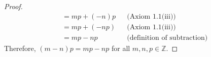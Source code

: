 \begin{enumerate}[label=(\roman*)]
\begin{proof}
\begin{align*}
                         & = mp+(-n)p  &  & \text{(Axiom 1.1(iii))}            \\
                         & = mp+(-np)  &  & \text{(Axiom 1.1(iii))}            \\
                         & = mp-np     &  & \text{(definition of subtraction)}
              \end{align*}
              Therefore, $(m-n)p=mp-np$ for all $m,n,p \in \mathbb{Z}$.
          \end{proof}


\end{enumerate}